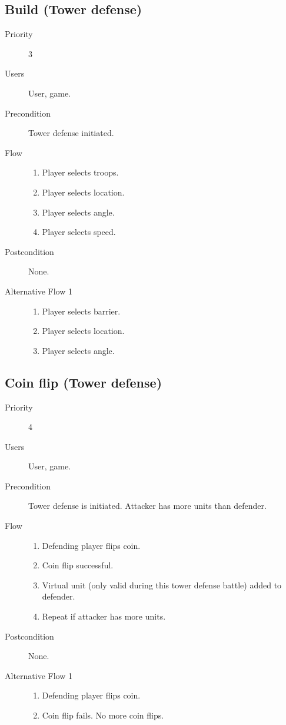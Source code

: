 \documentclass[12pt,a4paper]{article}
\begin{document}
\subsection{Build (Tower defense)}
\begin{description}
\item[Priority] 3
\item[Users] User, game.
\item[Precondition] Tower defense initiated.
\item[Flow]\mbox{}
  \begin{enumerate}
  \item Player selects troops.
  \item Player selects location.
  \item Player selects angle.
  \item Player selects speed.
  \end{enumerate}
\item[Postcondition] None.
\item[Alternative Flow 1]\mbox{}
  \begin{enumerate}
  \item Player selects barrier.
  \item Player selects location.
  \item Player selects angle.
  \end{enumerate}
\end{description}

\subsection{Coin flip (Tower defense)}
\begin{description}
\item[Priority] 4
\item[Users] User, game.
\item[Precondition] Tower defense is initiated. Attacker has more
  units than defender.
\item[Flow]\mbox{}
  \begin{enumerate}
  \item Defending player flips coin.
  \item Coin flip successful.
  \item Virtual unit (only valid during this tower defense battle) added
    to defender.
  \item Repeat if attacker has more units.
  \end{enumerate}
\item[Postcondition] None.
\item[Alternative Flow 1]\mbox{}
  \begin{enumerate}
  \item Defending player flips coin.
  \item Coin flip fails. No more coin flips.
  \end{enumerate}
\end{description}
\end{document}
